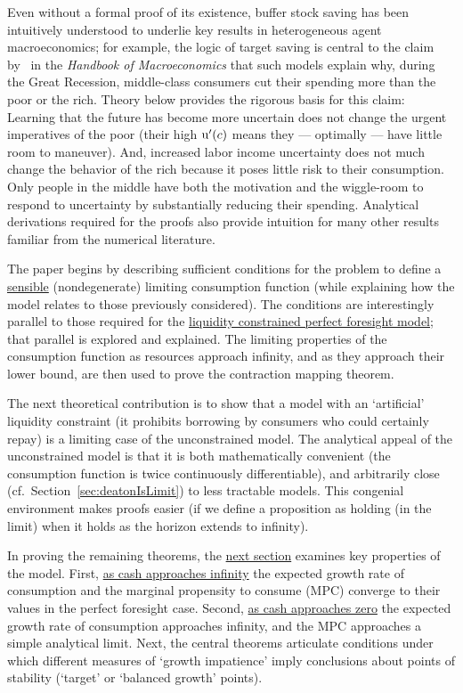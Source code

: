 \documentclass[BufferStockTheory]{subfiles}
\begin{document}
\hypertarget{KMP}{} Even without a formal proof of its existence, buffer stock saving has been intuitively understood to underlie key results in heterogeneous agent macroeconomics; for example, the logic of target saving is central to the claim by~\cite{kmpHandbook} in the \textit{Handbook of Macroeconomics} that such models explain why, during the Great Recession, middle-class consumers cut their spending more than the poor or the rich.  Theory below provides the rigorous basis for this claim:  Learning that the future has become more uncertain does not change the urgent imperatives of the poor (their high $\mathrm{u}^{\prime}(c)$ means they --- optimally --- have little room to maneuver).  And, increased labor income uncertainty does not much change the behavior of the rich because it poses little risk to their consumption.  Only people in the middle have both the motivation and the wiggle-room to respond to uncertainty by substantially reducing their spending.  Analytical derivations required for the proofs also provide intuition for many other results familiar from the numerical literature.

The paper begins by describing sufficient conditions for the problem to define a \hyperlink{sensible}{sensible} (nondegenerate) limiting consumption function (while explaining how the model relates to those previously considered).  The conditions are interestingly parallel to those required for the \hyperlink{Factors-Defined-And-Compared}{liquidity constrained perfect foresight model}; that parallel is explored and explained.  The limiting properties of the consumption function as resources approach infinity, and as they approach their lower bound, are then used to prove the contraction mapping theorem.

The next theoretical contribution is to show that a model with an `artificial' liquidity constraint (it prohibits borrowing by consumers who could certainly repay) is a limiting case of the unconstrained model.  The analytical appeal of the unconstrained model is that it is both mathematically convenient (the consumption function is twice continuously differentiable), and arbitrarily close (cf.\ Section~\ref{sec:deatonIsLimit}) to less tractable models. This congenial environment makes proofs easier (if we define a proposition as holding (in the limit) when it holds as the horizon extends to infinity).

In proving the remaining theorems, the \hyperlink{AnalysisoftheConvergedConsumptionFunction}{next section} examines key properties of the model. First, \hyperlink{LimitsAsmtToInfty}{as cash approaches infinity} the expected growth rate of consumption and the marginal propensity to consume (MPC) converge to their values in the perfect foresight case. Second, \hyperlink{LimitsAsmtToZero}{as cash approaches zero} the expected growth rate of consumption approaches infinity, and the MPC approaches a simple analytical limit.  Next, the central theorems articulate conditions under which different measures of `growth impatience' imply conclusions about points of stability (`target' or `balanced growth' points).
\end{document}

